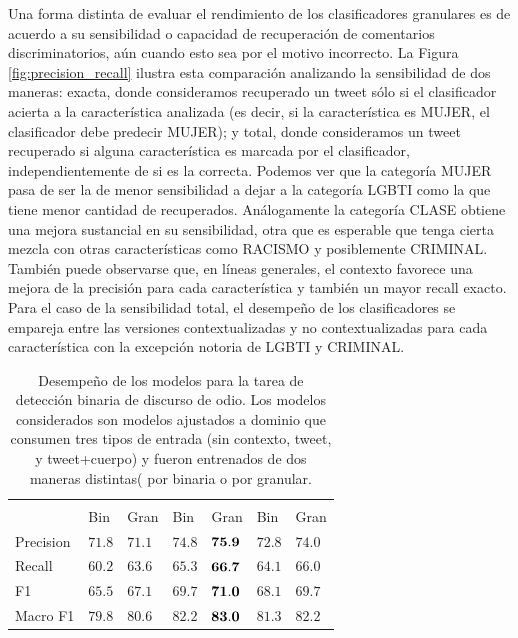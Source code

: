 Una forma distinta de evaluar el rendimiento de los clasificadores granulares es de acuerdo a su sensibilidad o capacidad de recuperación de comentarios discriminatorios, aún cuando esto sea por el motivo incorrecto. La Figura \ref{fig:precision_recall} ilustra esta comparación analizando la sensibilidad de dos maneras: exacta, donde consideramos recuperado un tweet sólo si el clasificador acierta a la característica analizada (es decir, si la característica es MUJER, el clasificador debe predecir MUJER); y total, donde consideramos un tweet recuperado si alguna característica es marcada por el clasificador, independientemente de si es la correcta. Podemos ver que la categoría MUJER pasa de ser la de menor sensibilidad a dejar a la categoría LGBTI como la que tiene menor cantidad de recuperados. Análogamente la categoría CLASE obtiene una mejora sustancial en su sensibilidad, otra que es esperable que tenga cierta mezcla con otras características como RACISMO y posiblemente CRIMINAL. También puede observarse que, en líneas generales, el contexto favorece una mejora de la precisión para cada característica y también un mayor recall exacto. Para el caso de la sensibilidad total, el desempeño de los clasificadores se empareja entre las versiones contextualizadas y no contextualizadas para cada característica con la excepción notoria de LGBTI y CRIMINAL.

\begin{table}[]
    \centering
    \begin{tabular}{l P{0.10\textwidth}P{0.10\textwidth} P{0.10\textwidth}P{0.10\textwidth}  P{0.10\textwidth}P{0.10\textwidth}}
                  &&           &      \\
                  & Bin   &    Gran         & Bin   &    Gran     & Bin  &   Gran     \\
        \hline
        Precision &  $71.8$ &  $71.1$       &  $74.8$& $\mathbf{75.9}$ & $72.8$ & $74.0$ \\
        Recall    &  $60.2$ &  $63.6$       &  $65.3$& $\mathbf{66.7}$ & $64.1$ & $66.0$ \\
        F1        &  $65.5$ &  $67.1$       &  $69.7$& $\mathbf{71.0}$ & $68.1$ & $69.7$ \\
        Macro F1  &  $79.8$ &  $80.6$       &  $82.2$& $\mathbf{83.0}$ & $81.3$ & $82.2$ \\
        \hline
        \end{tabular}
    \caption{Desempeño de los modelos para la tarea de detección binaria de discurso de odio. Los modelos considerados son modelos \beto{} ajustados a dominio que consumen tres tipos de entrada (sin contexto, tweet, y tweet+cuerpo) y fueron entrenados de dos maneras distintas( por binaria o  por granular.}
    \label{tab:plain_vs_granular_hate_detection}
\end{table}


